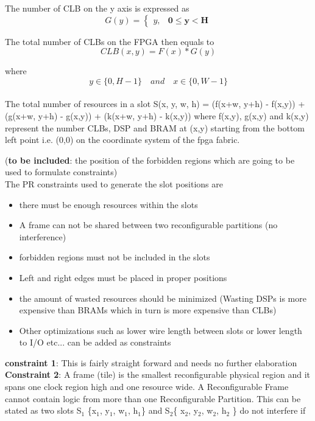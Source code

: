 \documentclass[11pt]{article}
\theoremstyle{definition}
\begin{document}
The number of CLB on the y axis is expressed as 
\begin{equation}
G(y) =  \begin{cases}
y, & \textbf{0$\leq$y$<$H}
\end{cases}
\end{equation}

The total number of CLBs on the FPGA then equals to \\
\begin{equation}
CLB(x,y) =  F(x) * G(y)
\end{equation}					  
					  
\hspace{15mm} where \[y\in \{0, H-1 \}  \quad and \quad x\in \{0, W-1 \} \] \\

The total number of resources in a slot S(x, y, w, h) = (f(x+w, y+h) - f(x,y)) + (g(x+w, y+h) - g(x,y)) + (k(x+w, y+h) - k(x,y)) where f(x,y), g(x,y) and k(x,y) represent the number CLBs, DSP and BRAM at (x,y) starting from the bottom left point i.e. (0,0) on the coordinate system of the fpga fabric.

\hspace{15mm} (\textbf{to be included}: the position of the forbidden regions which are going to be used to formulate constraints) \\

The PR constraints used to generate the slot positions are
\begin{itemize}
\item there must be enough resources within the slots
\item A frame can not be shared between two reconfigurable partitions (no interference)
\item forbidden regions must not be included in the slots 
\item Left and right edges must be placed in proper positions
\item the amount of wasted resources should be minimized (Wasting DSPs is more expensive than BRAMs which in turn is more expensive than CLBs)
\item Other optimizations such as lower wire length between slots or lower length to I/O etc... can be added as constraints
\end{itemize}

\textbf{constraint 1}: This is fairly straight forward and needs no further elaboration \\
\textbf{Constraint 2}: A frame (tile) is the smallest reconfigurable physical region and it spans one clock region high and one resource wide. A Reconfigurable Frame cannot contain logic from more than one Reconfigurable Partition. This can be stated as two slots S$_1$ \{x$_1$, y$_1$, w$_1$, h$_1$\} and S$_2$\{ x$_2$, y$_2$, w$_2$, h$_2$ \} do not interfere if \\
\end{document}
